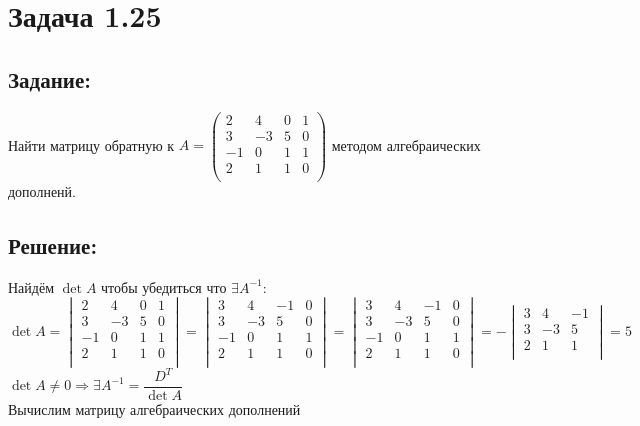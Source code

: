 \section{Задача 1.25}
\subsection{Задание:}
Найти матрицу обратную к
$
	A =
	\begin{pmatrix}
		2 & 4 & 0 & 1 \\
		3 & -3 & 5 & 0 \\
		-1 & 0 & 1 & 1 \\
		2 & 1 & 1 & 0 \\
	\end{pmatrix}
$
\; методом алгебраических дополненй.
\subsection{Решение:}
Найдём $ \det A $ чтобы убедиться что $ \exists A^{-1} $:
\\[1em]
$
	\det A =
	\begin{vmatrix}
		2 & 4 & 0 & 1 \\
		3 & -3 & 5 & 0 \\
		-1 & 0 & 1 & 1 \\
		2 & 1 & 1 & 0 \\
	\end{vmatrix}
	=
	\begin{vmatrix}
		3 & 4 & -1 & 0 \\
		3 & -3 & 5 & 0 \\
		-1 & 0 & 1 & 1 \\
		2 & 1 & 1 & 0 \\
	\end{vmatrix}
	=
	\begin{vmatrix}
		3 & 4 & -1 & 0 \\
		3 & -3 & 5 & 0 \\
		-1 & 0 & 1 & 1 \\
		2 & 1 & 1 & 0 \\
	\end{vmatrix}
	=
	-
	\begin{vmatrix}
		3 & 4 & -1 \\
		3 & -3 & 5 \\
		2 & 1 & 1 \\
	\end{vmatrix}
	=
	5
$
\\[1em]
$ \det A \neq 0 \Rightarrow \exists A^{-1} = \dfrac{D^T}{\det A} $
\\[1em]
Вычислим матрицу алгебраических дополнений
